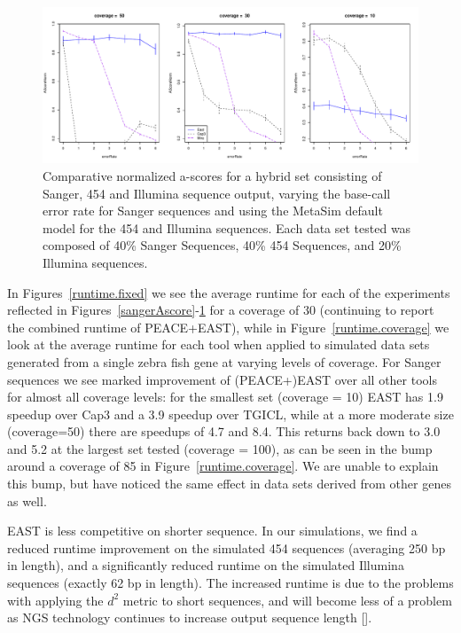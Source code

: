 \documentclass{bioinfo}
\newcommand{\peace} {{\small PEACE}}
\newcommand{\capthree} {{\small Cap3}}
\newcommand{\tgicl} {{\small TGICL}}
\newcommand{\east} {{\small EAST}}
\begin{document}
\begin{figure}[htb]
\centerline{\includegraphics[width=5in]{pics.d/ascore_hybrid.pdf}}
\caption{Comparative normalized a-scores for a hybrid set consisting
  of Sanger, 454 and Illumina sequence output, varying the base-call
  error rate for Sanger sequences and using the MetaSim default model
  for the 454 and Illumina sequences.  Each data set tested was
  composed of 40\% Sanger Sequences, 40\% 454 Sequences, and 20\%
  Illumina sequences.}
\label{hybridAscore}
\end{figure}

 In Figures~\ref{runtime.fixed} we see
the average runtime for each of the experiments reflected in
Figures~\ref{sangerAscore}-\ref{hybridAscore} for a coverage of 30
(continuing to report the combined runtime of \peace+\east), while in
Figure~\ref{runtime.coverage} we look at the average runtime for each
tool when applied to simulated data sets generated from a single zebra
fish gene at varying levels of coverage.  For Sanger sequences we
see marked improvement of (\peace+)\east\/ over all other tools for
almost all coverage levels: for the smallest set (coverage = 10)
\east\/ has 1.9 speedup over \capthree\/ and a 3.9 speedup over
\tgicl, while at a more moderate size (coverage=50) there are speedups of
4.7 and 8.4.  This returns back down to 3.0 and 5.2 at the largest set
tested (coverage = 100), as can be seen in the bump around a coverage
of 85 in Figure~\ref{runtime.coverage}.  We are unable to
explain this bump, but have noticed the same effect in
data sets derived from other genes as well.


\east\/ is less competitive on shorter sequence.  In our simulations,
we find a reduced runtime improvement on the simulated 454 sequences
(averaging 250 bp in length), and a significantly reduced runtime on
the simulated Illumina sequences (exactly 62 bp in length).  The
increased runtime is due to the problems with applying the $d^2$
metric to short sequences, and will become less of a problem as NGS
technology continues to increase output sequence length
[\cite{Eid09,Li10}]. 
\end{document}
